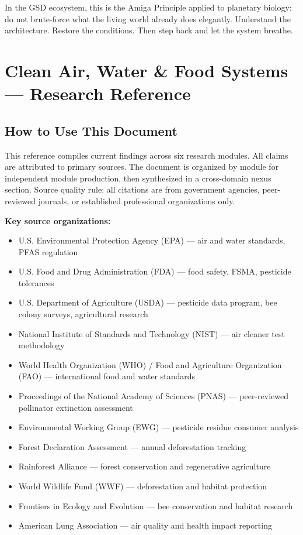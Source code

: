 \documentclass[11pt,letterpaper]{article}
\newcommand{\stageheader}[2]{%
  \noindent\colorbox{#2}{\makebox[\textwidth][l]{%
    \textcolor{white}{\bfseries\sffamily\hspace{6pt}#1\hspace{6pt}}}}%
  \vspace{0.5em}\par%
}
\begin{document}
In the GSD ecosystem, this is the Amiga Principle applied to planetary biology: do not brute-force what the living world already does elegantly. Understand the architecture. Restore the conditions. Then step back and let the system breathe.

\newpage
\stageheader{STAGE 2 --- RESEARCH REFERENCE}{secondary}

\section{Clean Air, Water \& Food Systems --- Research Reference}

\subsection{How to Use This Document}

This reference compiles current findings across six research modules. All claims are attributed to primary sources. The document is organized by module for independent module production, then synthesized in a cross-domain nexus section. Source quality rule: all citations are from government agencies, peer-reviewed journals, or established professional organizations only.

\textbf{Key source organizations:}
\begin{itemize}[leftmargin=*]
  \item U.S. Environmental Protection Agency (EPA) --- air and water standards, PFAS regulation
  \item U.S. Food and Drug Administration (FDA) --- food safety, FSMA, pesticide tolerances
  \item U.S. Department of Agriculture (USDA) --- pesticide data program, bee colony surveys, agricultural research
  \item National Institute of Standards and Technology (NIST) --- air cleaner test methodology
  \item World Health Organization (WHO) / Food and Agriculture Organization (FAO) --- international food and water standards
  \item Proceedings of the National Academy of Sciences (PNAS) --- peer-reviewed pollinator extinction assessment
  \item Environmental Working Group (EWG) --- pesticide residue consumer analysis
  \item Forest Declaration Assessment --- annual deforestation tracking
  \item Rainforest Alliance --- forest conservation and regenerative agriculture
  \item World Wildlife Fund (WWF) --- deforestation and habitat protection
  \item Frontiers in Ecology and Evolution --- bee conservation and habitat research
  \item American Lung Association --- air quality and health impact reporting
\end{itemize}
\end{document}
